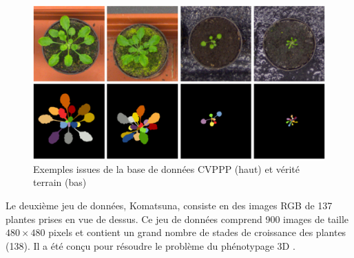 \documentclass[../thesis.tex]{subfiles}
\begin{document}
    \begin{figure}[H]
        \centering
        \includegraphics[width=0.8\linewidth]{img/leaf/dataset-cvppp}
        \caption{Exemples issues de la base de données CVPPP (haut) et vérité terrain (bas)}
        \label{fig:04-04-dataset-cvppp}
    \end{figure}
    
    Le deuxième jeu de données, Komatsuna, consiste en des images RGB de 137 plantes prises en vue de dessus. Ce jeu de données comprend 900 images de taille $480 \times 480$ pixels et contient un grand nombre de stades de croissance des plantes (138). Il a été conçu pour résoudre le problème du phénotypage 3D \cite{Uchiyama_2017_ICCV_Workshops}.
    
\end{document}
